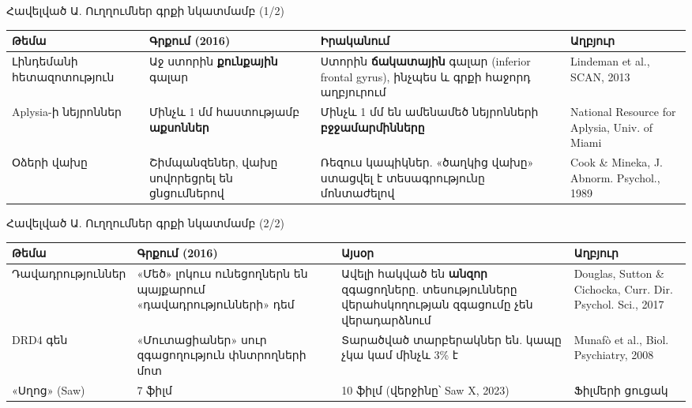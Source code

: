 \appendix
{}\gdef{}\gdef{}

\begin{frame}{Հավելված Ա. Ուղղումներ գրքի նկատմամբ (1/2)}
  \footnotesize
  \setlength{\tabcolsep}{4pt}
  \renewcommand{\arraystretch}{1.35}
  \begin{tabular}{@{}L{2.9cm}L{3.2cm}L{4.1cm}L{3.0cm}@{}}
    \toprule
    \textbf{Թեմա} & \textbf{Գրքում (2016)} & \textbf{Իրականում} & \textbf{Աղբյուր}\\
    \midrule
    Լինդեմանի հետազոտություն & Աջ ստորին \textbf{քունքային} գալար & Ստորին \textbf{ճակատային} գալար (inferior frontal gyrus), ինչպես և գրքի հաջորդ աղբյուրում & Lindeman et al., SCAN, 2013\\
    Aplysia-ի նեյրոններ & Մինչև 1 մմ հաստությամբ \textbf{աքսոններ} & Մինչև 1 մմ են ամենամեծ նեյրոնների \textbf{բջջամարմինները} & National Resource for Aplysia, Univ. of Miami\\
    Օձերի վախը & Շիմպանզեներ, վախը սովորեցրել են ցնցումներով & Ռեզուս կապիկներ. «ծաղկից վախը» ստացվել է տեսագրությունը մոնտաժելով & Cook \& Mineka, J. Abnorm. Psychol., 1989\\
    \bottomrule
  \end{tabular}
\end{frame}

\begin{frame}{Հավելված Ա. Ուղղումներ գրքի նկատմամբ (2/2)}
  \footnotesize
  \setlength{\tabcolsep}{4pt}
  \renewcommand{\arraystretch}{1.35}
  \begin{tabular}{@{}L{2.9cm}L{3.2cm}L{4.1cm}L{3.0cm}@{}}
    \toprule
    \textbf{Թեմա} & \textbf{Գրքում (2016)} & \textbf{Այսօր} & \textbf{Աղբյուր}\\
    \midrule
    Դավադրություններ & «Մեծ» լոկուս ունեցողներն են պայքարում «դավադրությունների» դեմ & Ավելի հակված են \textbf{անզոր} զգացողները. տեսությունները վերահսկողության զգացումը չեն վերադարձնում & Douglas, Sutton \& Cichocka, Curr. Dir. Psychol. Sci., 2017\\
    DRD4 գեն & «Մուտացիաներ» սուր զգացողություն փնտրողների մոտ & Տարածված տարբերակներ են. կապը չկա կամ մինչև 3\% է & Munafò et al., Biol. Psychiatry, 2008\\
    «Սղոց» (Saw) & 7 ֆիլմ & 10 ֆիլմ (վերջինը՝ Saw X, 2023) & Ֆիլմերի ցուցակ\\
    \bottomrule
  \end{tabular}
\end{frame}

